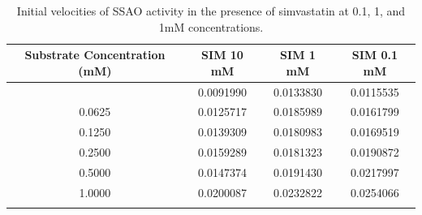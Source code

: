 \documentclass[
  letterpaper,
  DIV=11,
  numbers=noendperiod]{scrreprt}
\begin{document}
\begin{longtable}[]{@{}cccc@{}}

\toprule\noalign{}
Substrate Concentration (mM) & SIM 10 mM & SIM 1 mM & SIM 0.1 mM \\
\midrule\noalign{}
\endhead
\bottomrule\noalign{}
\endlastfoot
0.0000 & 0.0091990 & 0.0133830 & 0.0115535 \\
0.0625 & 0.0125717 & 0.0185989 & 0.0161799 \\
0.1250 & 0.0139309 & 0.0180983 & 0.0169519 \\
0.2500 & 0.0159289 & 0.0181323 & 0.0190872 \\
0.5000 & 0.0147374 & 0.0191430 & 0.0217997 \\
1.0000 & 0.0200087 & 0.0232822 & 0.0254066 \\

\caption{\label{tbl-sim-ini-v}Initial velocities of SSAO activity in the
presence of simvastatin at 0.1, 1, and 1mM concentrations.}

\tabularnewline

\end{longtable}
\end{document}
